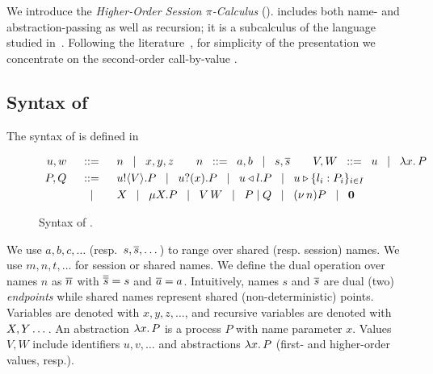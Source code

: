 \noindent 
We introduce the 
\emph{Higher-Order Session $\pi$-Calculus} (\HOp).
\HOp includes both name- and abstraction-passing 
as well as recursion; it is a subcalculus 
of the language
studied 
in~\cite{tlca07}. 
Following the literature~\cite{JeffreyR05},
for simplicity of the presentation
we concentrate on the second-order call-by-value \HOp.  


\subsection{Syntax of \HOp}
\label{subsec:syntax}
\noindent{} The syntax of \HOp is defined in 

\begin{figure}[t]
	\[
		\begin{array}{rcl}
			u,w &\;\;::=\;\;& n \;\;\;|\;\;\; x,y,z \qquad
			n \;\;::=\;\; a,b  \;\;\;|\;\;\; s, \overline{s} \qquad 
			V,W  \;\;::=\;\; u \;\;\;|\;\;\; \lambda x.\,P \\[1mm]
			P,Q & \;\;::=\;\; & u ! \langle V \rangle .{P}  \;\;\;|\;\;\;  u ? (x) .{P} \;\;\;|\;\;\;
			u \triangleleft l . P \;\;\;|\;\;\; u \triangleright \{l_i:P_i\}_{i \in I}   \\[1mm]
			& \;\;\;|\;\;\; & X \;\;\;|\;\;\; \mu X. P \;\;\;|\;\;\; V\, {W} \;\;\;|\;\;\; P\;|\; Q \;\;\;|\;\;\; (\nu\, n) P \;\;\;|\;\;\; \mathbf{0}
		\end{array}
	\]
	\caption{Syntax of \HOp.}
	\label{fig:syntax}
\end{figure}

We use $a,b,c, \dots$ (resp.~$s, \overline{s}, \dots$) 
to range over shared (resp. session) names. 
We use $m, n, t, \dots$ for session or shared names. 
We define the dual operation over names $n$ as $\overline{n}$ with
$\overline{\overline{s}} = s$ and $\overline{a} = a$.
Intuitively, names $s$ and $\overline{s}$ are dual (two) \emph{endpoints} while 
shared names represent shared (non-deterministic) points. 
Variables are denoted with $x, y, z, \dots$, 
and recursive variables are denoted with $X, Y \dots$.
An abstraction %
$\lambda x.\,P$ is a process $P$ with name parameter $x$.
Values $V,W$ include 
identifiers $u, v, \ldots$ %
and 
abstractions $\lambda x.\,P$ (first- and higher-order values, resp.). 

